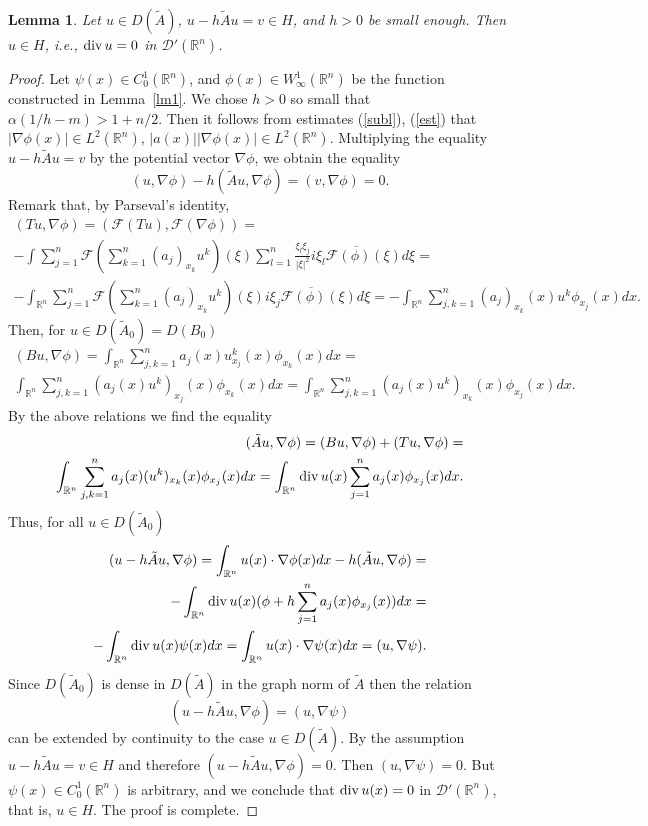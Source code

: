 \documentclass[12pt]{article}
\newcommand{\R}{{\mathbb R}}
\newcommand{\D}{{\mathcal D}}
\newcommand{\F}{{\mathcal F}}
\renewcommand{\div}{\mathop{\rm div}\nolimits}
\numberwithin{equation}{section}
\theoremstyle{plain}
\newtheorem{lemma}{Lemma}[section]
\theoremstyle{definition}
\begin{document}
\begin{lemma}\label{lm2}
Let $u\in D(\tilde A)$, $u-h\tilde Au=v\in H$, and $h>0$ be small enough. Then $u\in H$, i.e., $\div u=0$ in $\D'(\R^n)$.
\end{lemma}

\begin{proof}
Let $\psi(x)\in C_0^1(\R^n)$, and $\phi(x)\in W_\infty^1(\R^n)$ be the function constructed in Lemma~\ref{lm1}. We chose $h>0$ so small that $\alpha(1/h-m)>1+n/2$. Then it follows from estimates (\ref{subl}), (\ref{est}) that $|\nabla\phi(x)|\in L^2(\R^n)$, $|a(x)||\nabla\phi(x)|\in L^2(\R^n)$. Multiplying the equality $u-h\tilde Au=v$ by the potential vector $\nabla\phi$, we obtain the equality
\[(u,\nabla\phi)-h(\tilde Au,\nabla\phi)=(v,\nabla\phi)=0.\]
Remark that, by Parseval's identity,
\begin{align*}
(Tu,\nabla\phi)=(\F(Tu),\F(\nabla\phi))=\\ -\int \sum_{j=1}^n\F\left(\sum_{k=1}^n(a_j)_{x_k}u^k\right)(\xi)
\sum_{l=1}^n\frac{\xi_l\xi_j}{|\xi|^2}\overline{i\xi_l\F(\phi)(\xi)}d\xi=\\
-\int_{\R^n}\sum_{j=1}^n\F\left(\sum_{k=1}^n(a_j)_{x_k}u^k\right)(\xi)\overline{i\xi_j\F(\phi)(\xi)}d\xi=
-\int_{\R^n}\sum_{j,k=1}^n(a_j)_{x_k}(x)u^k\phi_{x_j}(x)dx.
\end{align*}
Then, for $u\in D(\tilde A_0)=D(B_0)$
\begin{align*}
(Bu,\nabla\phi)=\int_{\R^n}\sum_{j,k=1}^n a_j(x)u^k_{x_j}(x)\phi_{x_k}(x)dx=\\
\int_{\R^n}\sum_{j,k=1}^n (a_j(x)u^k)_{x_j}(x)\phi_{x_k}(x)dx=\int_{\R^n}\sum_{j,k=1}^n (a_j(x)u^k)_{x_k}(x)\phi_{x_j}(x)dx.
\end{align*}
By the above relations we find the equality
\begin{align}\label{ei3}
(\tilde Au,\nabla\phi)=(Bu,\nabla\phi)+(Tu,\nabla\phi)=\nonumber\\
\int_{\R^n}\sum_{j,k=1}^n a_j(x)(u^k)_{x_k}(x)\phi_{x_j}(x)dx=
\int_{\R^n}\div u(x)\sum_{j=1}^n a_j(x)\phi_{x_j}(x)dx.
\end{align}
Thus, for all $u\in D(\tilde A_0)$
\begin{align*}
(u-h\tilde Au,\nabla\phi)=\int_{\R^n}u(x)\cdot\nabla\phi(x)dx-h(\tilde Au,\nabla\phi)=\\ -\int_{\R^n}\div u(x)(\phi+h\sum_{j=1}^n a_j(x)\phi_{x_j}(x))dx=\\ -\int_{\R^n}\div u(x)\psi(x)dx=\int_{\R^n}u(x)\cdot\nabla\psi(x)dx=(u,\nabla\psi).
\end{align*}
Since $D(\tilde A_0)$ is dense in $D(\tilde A)$ in the graph norm of $\tilde A$ then the relation
\[(u-h\tilde Au,\nabla\phi)=(u,\nabla\psi)\] can be extended by continuity to the case $u\in D(\tilde A)$. By the assumption $u-h\tilde Au=v\in H$ and therefore
$(u-h\tilde Au,\nabla\phi)=0$. Then $(u,\nabla\psi)=0$. But $\psi(x)\in C_0^1(\R^n)$ is arbitrary, and we conclude that $\div u(x)=0$ in $\D'(\R^n)$, that is, $u\in H$. The proof is complete.
\end{proof}
\end{document}
